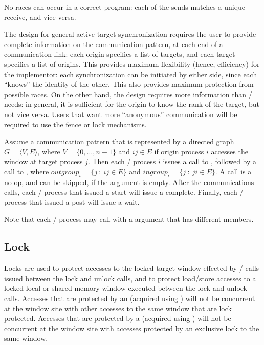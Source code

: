 No races can occur in a correct program: each of the sends matches a
unique receive, and vice versa. 

\begin{rationale}
The design for general active target synchronization requires the
user to provide complete information on the communication pattern, at
each end of a communication link: each origin specifies a list of
targets, and each target specifies a list of origins.  This provides
maximum flexibility (hence, efficiency) for the implementor: 
each
synchronization can be initiated by either side, since each ``knows''
the identity of the other.  This also provides maximum protection from
possible races.  On the other hand, the design requires more
information than \RMA/ needs: in general, it is sufficient
for the origin to know the rank of the target, but not vice
versa.
Users that want more ``anonymous'' communication will be required to
use the fence or lock mechanisms.
\end{rationale}

\begin{users}
Assume a communication pattern that is represented by a directed graph
$G = \langle V, E\rangle$, where $V = \{0, \ldots, n-1\}$ and $ij \in E$ if origin process
$i$ accesses the window at target process $j$.  Then each \mpi/ process $i$
issues a call to 
, 
followed by a call to\flushline
{},
where 
$outgroup_i = \{ j ~:~ ij \in E\}$ and $ingroup_i = \{ j ~:~ ji \in E
\}$.  A call is a no-op, and can be skipped, if the  argument is
empty. After the communications calls, each \mpi/ process that issued
a start will issue a complete.  Finally, each \mpi/ process that
issued  a post will issue a wait. 

Note that each \mpi/ process may call with a  argument that has
different members.
\end{users}
  
\subsection{Lock}
\label{sec:1sided-lock}

Locks are used to protect accesses to the locked target
window effected by \RMA/ calls issued between the lock and unlock
calls, and to protect
load/store accesses to a locked local or shared
memory window executed between the lock and unlock
calls.
Accesses that are protected by an  (acquired using )
will not be concurrent at the window site
with other accesses to the same window that are lock protected.
Accesses that are protected by a  (acquired using ) will not be
concurrent at the window site with
accesses protected by an exclusive lock to the same window.

